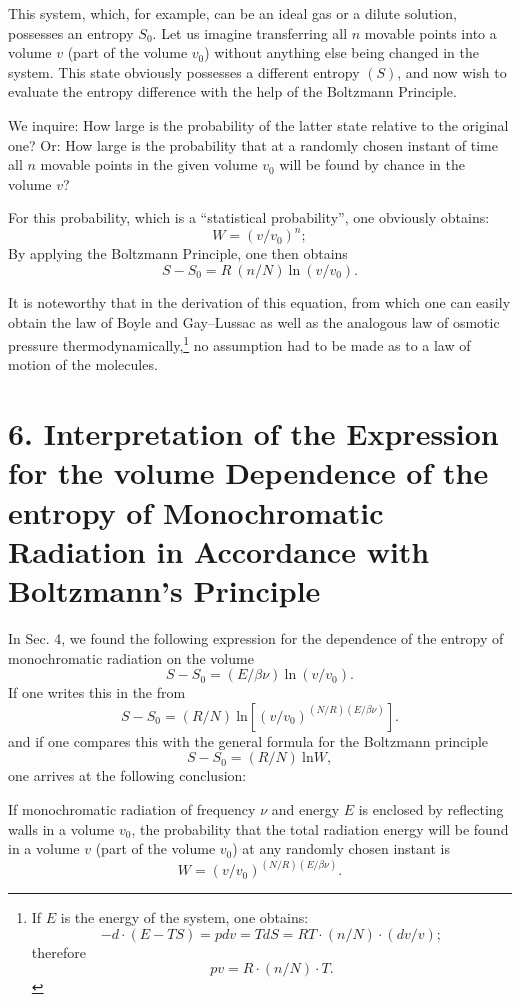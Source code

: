 \documentclass[12pt]{article}
\begin{document}
This system, which, for example, can be an ideal gas or a dilute solution,
possesses an entropy $S_0$. Let us imagine transferring all $n$ movable points
into a volume $v$ (part of the volume $v_0$) without anything else being changed
in the system. This state obviously possesses a different entropy $(S)$, and now
wish to evaluate the entropy difference with the help of the Boltzmann
Principle.

We inquire: How large is the probability of the latter state relative to the
original one? Or: How large is the probability that at a randomly chosen instant
of time all $n$ movable points in the given volume $v_0$ will be found by chance
in the volume $v$?

For this probability, which is a ``statistical probability'', one obviously
obtains:
$$
W = (v/v_0)^n;
$$
By applying the Boltzmann Principle, one then obtains
$$
S - S_0 = R ~ (n/N) ~ \mbox{ln}~ (v/v_0).
$$

It is noteworthy that in the derivation of this equation, from which one can
easily obtain the law of Boyle and Gay--Lussac as well as the analogous law of
osmotic pressure thermodynamically,\footnote{If $E$ is the energy of the system,
one obtains:
$$
- d \cdot (E - TS) = pdv = TdS = RT \cdot (n/N) \cdot (dv/v);
$$
therefore
$$
pv = R \cdot (n/N) \cdot T.
$$} no assumption had to be made as to a law of motion of the molecules.

\vspace{0.5cm}
\section*{
{\bf 6. Interpretation of the Expression for the volume Dependence of the
entropy of Monochromatic Radiation in Accordance with Boltzmann's Principle}}
\vspace{0.5cm}

In Sec. 4, we found the following expression for the dependence of the entropy
of monochromatic radiation on the volume
$$
S - S_0 = (E/\beta \nu) ~ \mbox{ln}~ (v/v_0).
$$
If one writes this in the from
$$
S - S_0 = (R/N) ~ \mbox{ln} \left[ (v/v_0)^{(N/R) (E/\beta \nu)}
\right].
$$
and if one compares this with the general formula for the Boltzmann principle
$$
S - S_0 = (R/N) ~ \mbox{ln} W,
$$
one arrives at the following conclusion:

If monochromatic radiation of frequency $\nu$ and energy $E$ is enclosed by
reflecting walls in a volume $v_0$, the probability that the total radiation
energy will be found in a volume $v$ (part of the volume $v_0$) at any randomly
chosen instant is 
$$
W = (v/v_0)^{(N/R)  (E/\beta \nu)}.
$$
\end{document}
